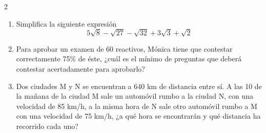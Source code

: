 \documentclass[10.5pt,letterpaper]{article}
\begin{document}
\begin{multicols}{2}
\begin{enumerate}
Calcular cuánto mide la base y la altura de dicho rectángulo.
\item Simplifica la siguiente expresión
\begin{equation*}
5\sqrt{8}-\sqrt{27}-\sqrt{32}+3\sqrt{3}+\sqrt{2}
\end{equation*}
\item Para aprobar un examen de 60 reactivos, Mónica tiene que contestar correctamente 75\% de éste, ¿cuál es el mínimo
de preguntas que deberá contestar acertadamente para aprobarlo?	
\item Dos ciudades M y N se encuentran a 640 km de distancia entre sí. A las 10 de la mañana de la ciudad M sale un
automóvil rumbo a la ciudad N, con una velocidad de 85
km/h, a la misma hora de N sale otro automóvil rumbo a M
con una velocidad de 75
km/h, ¿a qué hora se encontrarán y qué distancia ha recorrido cada uno?
\end{enumerate}
\end{multicols}
\end{document}
